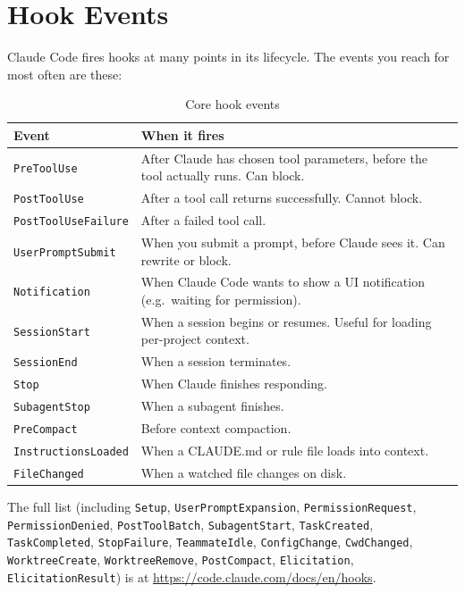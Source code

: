 \section{Hook Events}
\label{sec:hook-events}


Claude Code fires hooks at many points in its lifecycle. The events you reach
for most often are these:

\begin{table}[ht]
\centering
\caption{Core hook events}
\label{tab:hook-events}
\begin{tabularx}{\textwidth}{lX}
\toprule
\textbf{Event} & \textbf{When it fires} \\
\midrule
\texttt{PreToolUse}        & After Claude has chosen tool parameters, before the tool actually runs. Can block. \\
\texttt{PostToolUse}       & After a tool call returns successfully. Cannot block. \\
\texttt{PostToolUseFailure}& After a failed tool call. \\
\texttt{UserPromptSubmit}  & When you submit a prompt, before Claude sees it. Can rewrite or block. \\
\texttt{Notification}      & When Claude Code wants to show a UI notification (e.g.\ waiting for permission). \\
\texttt{SessionStart}      & When a session begins or resumes. Useful for loading per-project context. \\
\texttt{SessionEnd}        & When a session terminates. \\
\texttt{Stop}              & When Claude finishes responding. \\
\texttt{SubagentStop}      & When a subagent finishes. \\
\texttt{PreCompact}        & Before context compaction. \\
\texttt{InstructionsLoaded}& When a CLAUDE.md or rule file loads into context. \\
\texttt{FileChanged}       & When a watched file changes on disk. \\
\bottomrule
\end{tabularx}
\end{table}

The full list (including \texttt{Setup}, \texttt{UserPromptExpansion},
\texttt{PermissionRequest}, \texttt{PermissionDenied}, \texttt{PostToolBatch},
\texttt{SubagentStart}, \texttt{TaskCreated}, \texttt{TaskCompleted},
\texttt{StopFailure}, \texttt{TeammateIdle}, \texttt{ConfigChange},
\texttt{CwdChanged}, \texttt{WorktreeCreate}, \texttt{WorktreeRemove},
\texttt{PostCompact}, \texttt{Elicitation}, \texttt{ElicitationResult}) is at
\url{https://code.claude.com/docs/en/hooks}.

